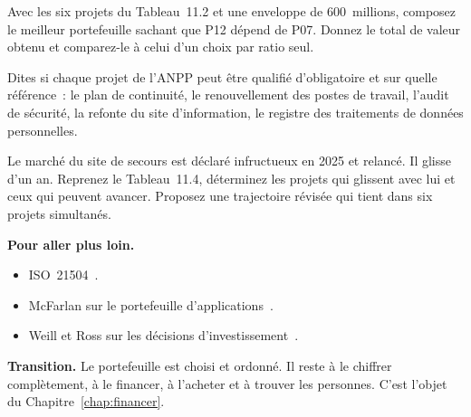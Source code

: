 \begin{boxexo}[title={\ding{45}\quad Exercice~11.2. L'enveloppe \niveaumoyen}]
Avec les six projets du Tableau~11.2 et une enveloppe de 600~millions, composez le meilleur portefeuille sachant que P12 dépend de P07. Donnez le total de valeur obtenu et comparez-le à celui d'un choix par ratio seul.
\end{boxexo}

\begin{boxexo}[title={\ding{45}\quad Exercice~11.3. Obligatoire ou non \niveaumoyen}]
Dites si chaque projet de l'ANPP peut être qualifié d'obligatoire et sur quelle référence~: le plan de continuité, le renouvellement des postes de travail, l'audit de sécurité, la refonte du site d'information, le registre des traitements de données personnelles.
\end{boxexo}

\begin{boxexo}[title={\ding{45}\quad Exercice~11.4. La trajectoire contrainte \niveauexpert}]
Le marché du site de secours est déclaré infructueux en 2025 et relancé. Il glisse d'un an. Reprenez le Tableau~11.4, déterminez les projets qui glissent avec lui et ceux qui peuvent avancer. Proposez une trajectoire révisée qui tient dans six projets simultanés.
\end{boxexo}

\bigskip

\begin{boxinfo}
\textbf{Pour aller plus loin.}
\begin{itemize}
    \item ISO~21504~\cite{iso21504}.
    \item McFarlan sur le portefeuille d'applications~\cite{mcfarlan1984}.
    \item Weill et Ross sur les décisions d'investissement~\cite{weillross2004}.
\end{itemize}
\end{boxinfo}

\begin{boxinfo}
\textbf{Transition.} Le portefeuille est choisi et ordonné. Il reste à le chiffrer complètement, à le financer, à l'acheter et à trouver les personnes. C'est l'objet du Chapitre~\ref{chap:financer}.
\end{boxinfo}
